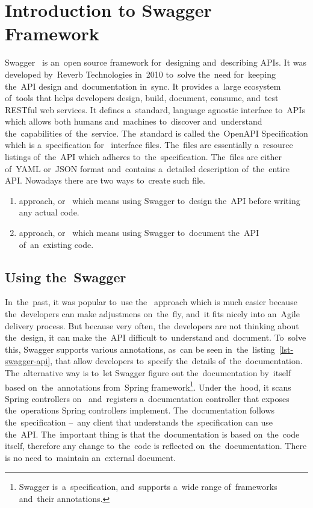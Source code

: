 \section{Introduction to Swagger Framework}
Swagger~\cite{Swagger} is an~open source framework for~designing and~describing
APIs. It was developed by~Reverb Technologies in~2010 to~solve the~need
for~keeping the~API design and~documentation in~sync. It provides a~large
ecosystem of~tools that helps developers design, build, document, consume,
and~test RESTful web services. It defines a~standard, language agnostic
interface to~APIs which allows both humans and~machines to~discover
and~understand the~capabilities of~the~service. The~standard is called
the~OpenAPI Specification which is a~specification for~
interface files. The~files are essentially a~resource listings of~the~API which
adheres to~the~specification. The~files are either of~YAML or~JSON format
and~contains a~detailed description of~the~entire API. Nowadays there are two
ways to~create such file.

\begin{enumerate}
  \item {} approach, or~ which means using Swagger
  to~design the~API before writing any actual code.
  \item {} approach, or~ which means using Swagger
  to~document the~API of~an~existing code.
\end{enumerate}


\subsection{Using the~Swagger}
In~the~past, it was popular to~use the~ approach which is much
easier because the~developers can make adjustmens on~the~fly, and~it fits nicely
into an~Agile delivery process. But because very often, the~developers are not
thinking about the~design, it can make the~API difficult to~understand
and~document. To~solve this, Swagger supports various annotations, as~can be
seen in~the~listing~\ref{lst-swagger-api}, that allow developers to~specify
the~details of~the~documentation. The~alternative way is to~let Swagger figure
out the~documentation by~itself based on~the~annotations from~Spring
framework\footnote{Swagger is~a~specification, and~supports a~wide range
of~frameworks and~their annotations.}. Under the~hood, it scans Spring
controllers on~ and~registers a~documentation controller that
exposes the~operations Spring controllers implement. The~documentation follows
the~specification --~any client that understands the~specification can use
the~API. The~important thing is that the~documentation is based on~the~code
itself, therefore any change to~the~code is reflected on~the~documentation.
There is no need to~maintain an~external document.

